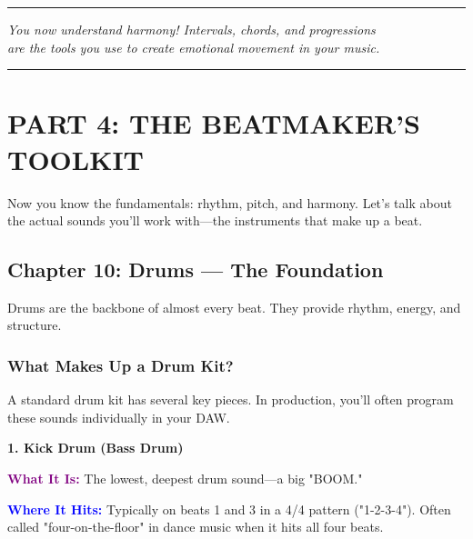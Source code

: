 \documentclass[11pt,letterpaper]{article}
\newcommand{\purple}[1]{\textcolor{purple}{\textbf{#1}}}
\newcommand{\bluepurple}[1]{\textcolor{blue}{\textbf{#1}}}
\begin{document}
\begin{center}
\rule{0.6\textwidth}{0.5pt}

\vspace{0.3cm}

\textit{You now understand harmony! Intervals, chords, and progressions \\
are the tools you use to create emotional movement in your music.}

\vspace{0.3cm}

\rule{0.6\textwidth}{0.5pt}
\end{center}

\newpage


\section*{PART 4: THE BEATMAKER'S TOOLKIT}

Now you know the fundamentals: rhythm, pitch, and harmony. Let's talk about the actual sounds you'll work with—the instruments that make up a beat.

\subsection{Chapter 10: Drums — The Foundation}

Drums are the backbone of almost every beat. They provide rhythm, energy, and structure.

\subsubsection{What Makes Up a Drum Kit?}

A standard drum kit has several key pieces. In production, you'll often program these sounds individually in your DAW.

\vspace{0.5cm}

\textbf{1. Kick Drum (Bass Drum)}

\textbf{\purple{What It Is:}} The lowest, deepest drum sound—a big "BOOM." 

\textbf{\bluepurple{Where It Hits:}} Typically on beats 1 and 3 in a 4/4 pattern ("1-2-3-4"). Often called "four-on-the-floor" in dance music when it hits all four beats.
\end{document}
